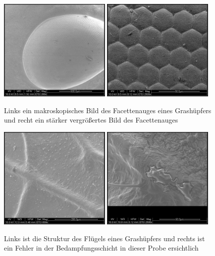 \documentclass[12pt,english,ngerman]{scrartcl}
\begin{document}
\begin{figure}[H]
	\centering
	\includegraphics[width=0.48\textwidth]{./figures/auge.png}
	\includegraphics[width=0.48\textwidth]{./figures/auge2.png}
	\caption{Links ein makroskopisches Bild des Facettenauges eines Grashüpfers und recht ein stärker vergrößertes Bild des Facettenauges
	}\label{fig:auge}
\end{figure}

\begin{figure}[H]
	\centering
	\includegraphics[width=0.48\textwidth]{./figures/flugel.png}
	\includegraphics[width=0.48\textwidth]{./figures/damage.png}
	\caption{Links ist die Struktur des Flügels eines Grashüpfers und rechts ist ein Fehler in der Bedampfungsschicht in dieser Probe ersichtlich
	}\label{fig:flugel}
\end{figure}
\end{document}
